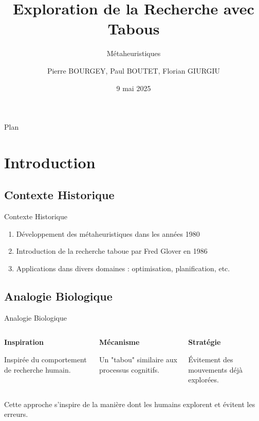 \documentclass[10pt, handout]{beamer}
\title{Exploration de la Recherche avec Tabous}
\subtitle{Métaheuristiques}
\author{Pierre BOURGEY, Paul BOUTET, Florian GIURGIU}
\institute{Télécom Saint-Etienne}
\date{9 mai 2025}
\begin{document}
\begin{frame}
    \titlepage
\end{frame}

\begin{frame}{Plan}
    \tableofcontents[hideallsubsections]
\end{frame}

\section{Introduction}
\subsection{Contexte Historique}
\begin{frame}{Contexte Historique}
    \begin{enumerate}
        \item Développement des métaheuristiques dans les années 1980
        \item Introduction de la recherche taboue par Fred Glover en 1986
        \item Applications dans divers domaines : optimisation, planification, etc.
    \end{enumerate}
\end{frame}

\subsection{Analogie Biologique}
\begin{frame}{Analogie Biologique}
    \begin{columns}[T] %
        \begin{column}{0.33\textwidth}
            \textbf{Inspiration}
            \medskip

            Inspirée du comportement de recherche humain. \medskip

        \end{column}
        \begin{column}{0.33\textwidth}

            \textbf{Mécanisme}
            \medskip

            Un "tabou" similaire aux processus cognitifs. \medskip

        \end{column}
        \begin{column}{0.33\textwidth}
            \textbf{Stratégie}
            \medskip

            Évitement des mouvements déjà explorées.
            \medskip

        \end{column}
    \end{columns}
    \bigskip
    Cette approche s'inspire de la manière dont les humains explorent et évitent les erreurs.
\end{frame}
\end{document}
